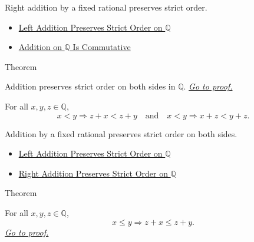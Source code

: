 \begin{remark*}[Interpretation]
Right addition by a fixed rational preserves strict order.
\end{remark*}

\begin{dependencies}
\begin{itemize}
  \item \hyperref[thm:left-addition-preserves-strict-order-on-q]{Left Addition Preserves Strict Order on $\mathbb{Q}$}
  \item \hyperref[thm:addition-on-q-commutative]{Addition on $\mathbb{Q}$ Is Commutative}
\end{itemize}
\end{dependencies}

\begin{theorembox}{Theorem}
\begin{theorem}
\label{thm:addition-preserves-strict-order-on-q}
Addition preserves strict order on both sides in $\mathbb{Q}$.
\hyperref[prf:addition-preserves-strict-order-on-q]{\textit{Go to proof.}}
\end{theorem}
\end{theorembox}

\begin{remark*}
For all $x,y,z\in\mathbb{Q}$,
\[
x<y\Longrightarrow z+x<z+y
\quad\text{and}\quad
x<y\Longrightarrow x+z<y+z.
\]
\end{remark*}

\begin{remark*}[Interpretation]
Addition by a fixed rational preserves strict order on both sides.
\end{remark*}

\begin{dependencies}
\begin{itemize}
  \item \hyperref[thm:left-addition-preserves-strict-order-on-q]{Left Addition Preserves Strict Order on $\mathbb{Q}$}
  \item \hyperref[cor:right-addition-preserves-strict-order-on-q]{Right Addition Preserves Strict Order on $\mathbb{Q}$}
\end{itemize}
\end{dependencies}

\begin{theorembox}{Theorem}
\begin{theorem}
\label{thm:left-addition-preserves-order-on-q}
For all $x,y,z\in\mathbb{Q}$,
\[
x\le y \Longrightarrow z+x\le z+y.
\]
\hyperref[prf:left-addition-preserves-order-on-q]{\textit{Go to proof.}}
\end{theorem}
\end{theorembox}

